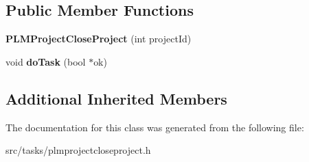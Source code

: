 \subsection*{Public Member Functions}
\begin{DoxyCompactItemize}
\item 
{\bfseries P\+L\+M\+Project\+Close\+Project} (int project\+Id)\hypertarget{class_p_l_m_project_close_project_a08c831497553d51b64bce730d2d8c9a8}{}\label{class_p_l_m_project_close_project_a08c831497553d51b64bce730d2d8c9a8}

\item 
void {\bfseries do\+Task} (bool $\ast$ok)\hypertarget{class_p_l_m_project_close_project_aefc50afc81794804564e268f109e7b29}{}\label{class_p_l_m_project_close_project_aefc50afc81794804564e268f109e7b29}

\end{DoxyCompactItemize}
\subsection*{Additional Inherited Members}


The documentation for this class was generated from the following file\+:\begin{DoxyCompactItemize}
\item 
src/tasks/plmprojectcloseproject.\+h\end{DoxyCompactItemize}
